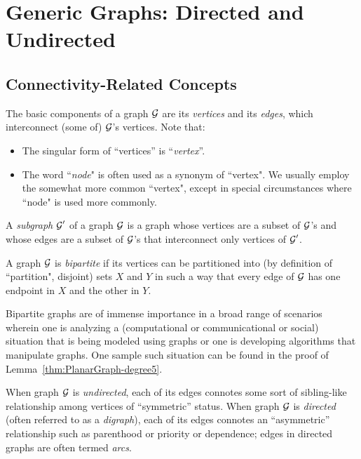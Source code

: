 \section{Generic Graphs: Directed and Undirected}
\label{sec:graphs-generic}
\label{sec:basic-graphs}

\subsection{Connectivity-Related Concepts}
\label{sec:connectivity-notions}

The basic components of a graph $\mbox{$\cal G$}$ are its {\it vertices} and its {\it edges}, which interconnect
(some of) $\mbox{$\cal G$}$'s vertices.  Note that:
\begin{itemize}
\item
The singular form of ``vertices'' is ``{\it vertex}''.
\item
The word ``{\it node}" is often used as a synonym of ``vertex".  We usually employ the
somewhat more common ``vertex", except in special circumstances where ``node" is used
more commonly.
\end{itemize}
A {\it subgraph} $\mbox{$\cal G$}'$ of a graph $\mbox{$\cal G$}$ is a graph whose vertices are a subset of $\mbox{$\cal G$}$'s and
whose edges are a subset of $\mbox{$\cal G$}$'s that interconnect only vertices of $\mbox{$\cal G$}'$. 

\medskip

A graph $\mbox{$\cal G$}$ is {\em bipartite} if its vertices can be partitioned into (by definition of
``partition", disjoint) sets $X$ and $Y$ in such a way that every edge of $\mbox{$\cal G$}$ has one
endpoint in $X$ and the other in $Y$.

Bipartite graphs are of immense importance in a broad range of scenarios wherein one is 
analyzing a (computational or communicational or social) situation that is being modeled using
graphs or one is developing algorithms that manipulate graphs.  One sample such situation
can be found in the proof of Lemma~\ref{thm:PlanarGraph-degree5}.

\medskip

When graph $\mbox{$\cal G$}$ is {\em undirected},  each of
its edges connotes some sort of sibling-like relationship among vertices
of ``symmetric'' status.  When graph $\mbox{$\cal G$}$ is {\em directed}
 (often referred to as a {\em digraph}),
  each of its edges connotes an
``asymmetric'' relationship such as parenthood or priority or dependence;
edges in directed graphs are often termed {\em
  arcs}.  

